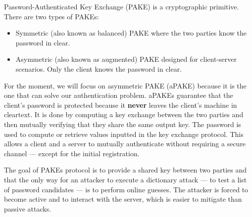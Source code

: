 ﻿\documentclass[../report.tex]{subfiles}
\begin{document}
Password-Authenticated Key Exchange (PAKE) is a cryptographic primitive. There are two types of PAKEs: 
\begin{itemize}
 \item Symmetric (also known as balanced) PAKE where the two parties know the password in clear.
 \item Asymmetric (also known as augmented) PAKE designed for client-server scenarios. Only the client knows the password in clear.
\end{itemize}
For the moment, we will focus on asymmetric PAKE (aPAKE) because it is the one that can solve our authentication problem.
aPAKEs guarantee that the client's password is protected because it \textbf{never} leaves the client's machine in cleartext.
It is done by computing a key exchange between the two parties and then mutually verifying that they share the same output key. The password is used to compute or retrieve values inputted in the key exchange protocol.
This allows a client and a server to mutually authenticate without requiring a secure channel --- except for the initial registration.

The goal of PAKEs protocol is to provide a shared key between two parties and that the only way for an attacker to execute a dictionary attack --- to test a list of password candidates --- is to perform online guesses. The attacker is forced to become active and to interact with the server, which is easier to mitigate than passive attacks.
\end{document}
